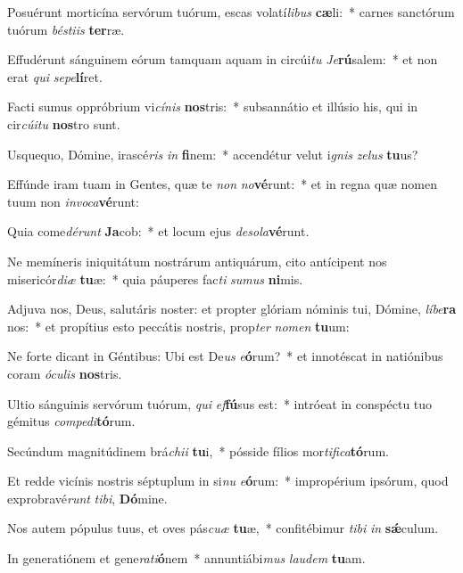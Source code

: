 \item Posuérunt morticína servórum tuórum, escas volatí\textit{li}\textit{bus} \textbf{cæ}li:~* carnes sanctórum tuórum \textit{bés}\textit{ti}\textit{is} \textbf{ter}ræ.
\item Effudérunt sánguinem eórum tamquam aquam in circúi\textit{tu} \textit{Je}\textbf{rú}salem:~* et non erat \textit{qui} \textit{se}\textit{pe}\textbf{lí}ret.
\item Facti sumus oppróbrium vi\textit{cí}\textit{nis} \textbf{nos}tris:~* subsannátio et illúsio his, qui in cir\textit{cú}\textit{i}\textit{tu} \textbf{nos}tro sunt.
\item Usquequo, Dómine, irascé\textit{ris} \textit{in} \textbf{fi}nem:~* accendétur velut i\textit{gnis} \textit{ze}\textit{lus} \textbf{tu}us?
\item Effúnde iram tuam in Gentes, quæ te \textit{non} \textit{no}\textbf{vé}runt:~* et in regna quæ nomen tuum non \textit{in}\textit{vo}\textit{ca}\textbf{vé}runt:
\item Quia come\textit{dé}\textit{runt} \textbf{Ja}cob:~* et locum ejus \textit{de}\textit{so}\textit{la}\textbf{vé}runt.
\item Ne memíneris iniquitátum nostrárum antiquárum, cito antícipent nos misericór\textit{di}\textit{æ} \textbf{tu}æ:~* quia páuperes fac\textit{ti} \textit{su}\textit{mus} \textbf{ni}mis.
\item Adjuva nos, Deus, salutáris noster: et propter glóriam nóminis tui, Dómine, \textit{lí}\textit{be}\textbf{ra} nos:~* et propítius esto peccátis nostris, prop\textit{ter} \textit{no}\textit{men} \textbf{tu}um:
\item Ne forte dicant in Géntibus: Ubi est De\textit{us} \textit{e}\textbf{ó}rum?~* et innotéscat in natiónibus coram \textit{ó}\textit{cu}\textit{lis} \textbf{nos}tris.
\item Ultio sánguinis servórum tuórum, \textit{qui} \textit{ef}\textbf{fú}sus est:~* intróeat in conspéctu tuo gémitus \textit{com}\textit{pe}\textit{di}\textbf{tó}rum.
\item Secúndum magnitúdinem brá\textit{chi}\textit{i} \textbf{tu}i,~* pósside fílios mor\textit{ti}\textit{fi}\textit{ca}\textbf{tó}rum.
\item Et redde vicínis nostris séptuplum in si\textit{nu} \textit{e}\textbf{ó}rum:~* impropérium ipsórum, quod exprobravé\textit{runt} \textit{ti}\textit{bi}, \textbf{Dó}mine.
\item Nos autem pópulus tuus, et oves pás\textit{cu}\textit{æ} \textbf{tu}æ,~* confitébimur \textit{ti}\textit{bi} \textit{in} \textbf{sǽ}culum.
\item In generatiónem et gene\textit{ra}\textit{ti}\textbf{ó}nem~* annuntiábi\textit{mus} \textit{lau}\textit{dem} \textbf{tu}am.
